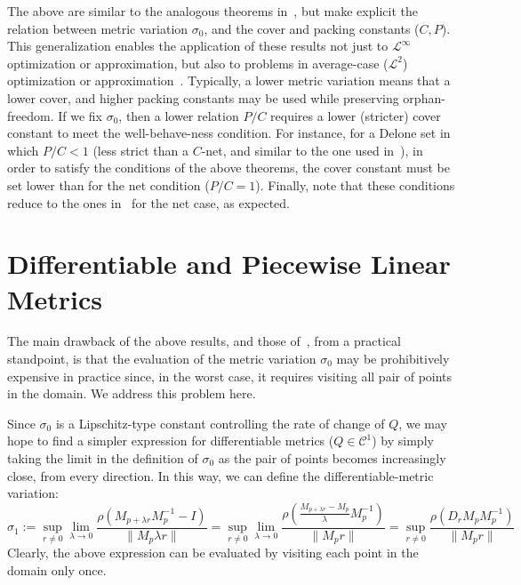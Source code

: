 \documentclass[11pt]{article}
\newcommand{\s}{\sigma}
\newcommand{\C}{\mathcal{C}}
\begin{document}
The above are similar to the analogous theorems in~\cite{avd}, but make explicit the relation between metric variation $\s_0$, and the cover and packing constants ($C,P$). 
This generalization enables the application of these results not just to $\mathcal{L}^\infty$ optimization or approximation, 
	but also to problems in average-case ($\mathcal{L}^2$) optimization or approximation~\cite{OQ,GruberOQ}. 
Typically, a lower metric variation means that a lower cover, and higher packing constants may be used while preserving orphan-freedom. 
If we fix $\s_0$, then a lower relation $P/C$ requires a lower (stricter) cover constant to meet the well-behave-ness condition. 
For instance, for a Delone set in which $P/C < 1$ (less strict than a $C$-net, and similar to the one used in~\cite{GruberOQ}), in order to satisfy the conditions of the above theorems, 
	the cover constant must be set lower than for the net condition ($P/C=1$). 	
Finally, note that these conditions reduce to the ones in~\cite{avd} for the net case, as expected. 



\section{Differentiable and Piecewise Linear Metrics}\label{C1}










The main drawback of  the above results, and those of~\cite{avd}, from a practical standpoint, is that the evaluation of the metric variation $\s_0$ may be prohibitively expensive in practice since, 
	in the worst case, it requires visiting all pair of points in the domain.  We address this problem here. 

Since $\s_0$ is a Lipschitz-type constant controlling the rate of change of $Q$, we may hope to find a simpler expression for differentiable metrics ($Q\in\C^1$) by simply taking the limit 
	in the definition of $\s_0$ as the pair of points becomes increasingly close, from every direction. In this way, we can define the differentiable-metric variation:
\[
	\s_1 := \displaystyle{\sup_{r\ne 0} \lim_{\lambda\rightarrow 0}\frac{ \rho\left( M_{p+\lambda r}  M_p^{-1} - I \right) }{ \|M_p \lambda r\| } } 
	= \displaystyle{\sup_{r\ne 0} \lim_{\lambda\rightarrow 0}\frac{ \rho\left( \frac{M_{p+\lambda r} - M_p}{\lambda} M_p^{-1}\right) }{ \|M_p r\| } } 
	= \displaystyle{\sup_{r\ne 0} \frac{\rho(D_r M_p M_p^{-1})}{ \|M_p r\| }}
\]
Clearly, the above expression can be evaluated by visiting each point in the domain only once. 
\end{document}
